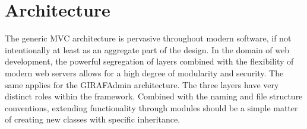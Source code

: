 \section{Architecture}
The generic MVC architecture is pervasive throughout modern software, if not intentionally at least as an aggregate part of the design. In the domain of web development, the powerful segregation of layers combined with the flexibility of modern web servers allows for a high degree of modularity and security.
The same applies for the GIRAFAdmin architecture. The three layers have very distinct roles within the framework. Combined with the naming and file structure conventions, extending functionality through modules should be a simple matter of creating new classes with specific inheritance.